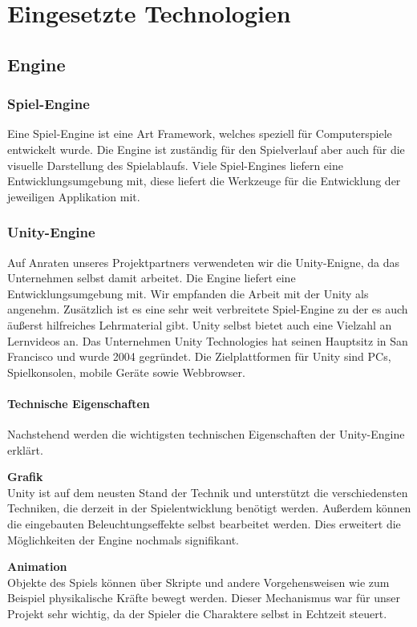 \chapter{Eingesetzte Technologien}
\def \currentAuthor {Lukas Vogel}
\section{Engine}

\subsection{Spiel-Engine}
Eine Spiel-Engine ist eine Art Framework, welches speziell für Computerspiele entwickelt wurde. Die Engine ist zuständig für den Spielverlauf aber auch für die visuelle Darstellung des Spielablaufs. Viele Spiel-Engines liefern eine Entwicklungsumgebung mit, diese liefert die Werkzeuge für die Entwicklung der jeweiligen Applikation mit.  \cite{Spiel-Engine}

\subsection{Unity-Engine}
Auf Anraten unseres Projektpartners verwendeten wir die Unity-Enigne, da das Unternehmen selbst damit arbeitet. Die Engine liefert eine Entwicklungsumgebung mit. Wir empfanden die Arbeit mit der Unity als angenehm. Zusätzlich ist es eine sehr weit verbreitete Spiel-Engine zu der es auch äußerst hilfreiches Lehrmaterial gibt. Unity selbst bietet auch eine Vielzahl an Lernvideos an.
Das Unternehmen Unity Technologies hat seinen Hauptsitz in San Francisco und wurde 2004 gegründet. Die Zielplattformen für Unity sind PCs, Spielkonsolen, mobile
Geräte sowie Webbrowser. 
 \cite{Unity-Engine}

\subsubsection{Technische Eigenschaften}
Nachstehend werden die wichtigsten technischen Eigenschaften der Unity-Engine erklärt. 

\textbf{Grafik}\\
Unity ist auf dem neusten Stand der Technik und unterstützt die verschiedensten Techniken, die derzeit in der Spielentwicklung benötigt werden. Außerdem können die eingebauten Beleuchtungseffekte selbst bearbeitet werden. Dies erweitert die Möglichkeiten der Engine nochmals signifikant.

\textbf{Animation}\\
Objekte des Spiels können über Skripte und andere Vorgehensweisen wie zum Beispiel physikalische Kräfte bewegt werden. Dieser Mechanismus war für unser Projekt sehr wichtig, da der Spieler die Charaktere selbst in Echtzeit steuert.

